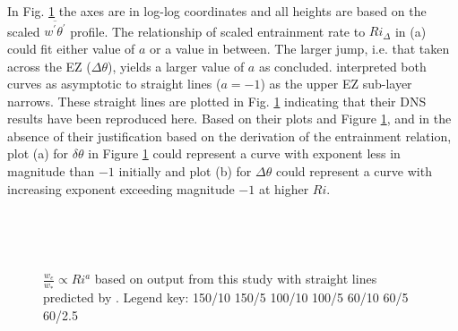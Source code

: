 
In Fig. \ref{fig:weinvri_f} the axes are in log-log coordinates and all heights are based on the scaled $\overline{w^{'}\theta^{'}}$ profile. The relationship of scaled entrainment rate to $Ri_{\Delta}$ in (a) could fit either value of $a$ or a value in between.  The larger jump, i.e. that taken across the EZ ($\Delta \theta$), yields a larger value of $a$ as \cite{FedConzMir04} concluded.  \cite{GarciaMellado} interpreted both curves as asymptotic to straight lines ($a=-1$) as the upper EZ sub-layer narrows.  These straight lines are plotted in Fig. \ref{fig:weinvri_f} indicating that their DNS results have been reproduced here. Based on their plots and Figure \ref{fig:weinvri_f}, and in the absence of their justification based on the derivation of the entrainment relation, plot (a) for $\delta \theta$ in Figure \ref{fig:weinvri_f} could represent a curve with exponent less in magnitude than $-1$ initially and plot (b) for $\Delta \theta$ could represent a curve with increasing exponent exceeding magnitude $-1$ at higher $Ri$.\\

\begin{figure}[htbp]

\begin{minipage}[b]{0.5\linewidth}
        \\
        \end{minipage}             
\quad
\begin{minipage}[b]{0.5\linewidth}
        \\      
       \end{minipage}
        \caption[]{
$\frac{w_{e}}{w_{*}} \propto Ri^{a}$ based on output from this study with straight lines predicted by \cite{GarciaMellado}.  Legend key: {\color{red} } 150/10  150/5 \hspace{2mm} {\color{black} } 100/10 \hspace{2mm} {\color{black} } 100/5 \hspace{2mm} {\color{offyellow} } 60/10 \hspace{2mm} {\color{offyellow} } 60/5 \hspace{2mm} {\color{offyellow} } 60/2.5}
        \label{fig:weinvri_f}

\end{figure}

